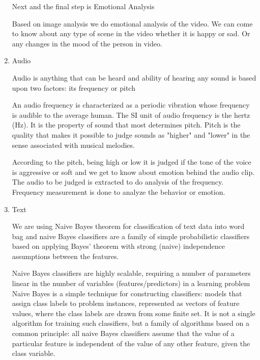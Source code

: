 \begin{enumerate}
	Next and the final step is Emotional Analysis
	
	Based on image analysis we do emotional analysis of the video. We can come to know about any type of scene in the video whether it is happy or sad. Or any changes in the mood of the person in video.
	
	\item Audio
	
	Audio is anything that can be heard and ability of hearing any sound is based upon two factors: its frequency or pitch
	
	An audio frequency  is characterized as a periodic vibration whose frequency is audible to the average human. The SI unit of audio frequency is the hertz (Hz). It is the property of sound that most determines pitch. Pitch is the quality that makes it possible to judge sounds as "higher" and "lower" in the sense associated with musical melodies.
	
	
	
	According to the pitch, being high or low it is judged if the tone of the voice is aggressive or soft and we get to know about emotion behind the audio clip. The audio to be judged is extracted to do analysis of the frequency. Frequency measurement is done to analyze the behavior or emotion.
	
	\item Text
	
	We are using Naive Bayes theorem for classification of text data into word bag and naive Bayes classifiers are a family of simple probabilistic classifiers based on applying Bayes' theorem with strong (naive) independence assumptions between the features.
	
	Naive Bayes classifiers are highly scalable, requiring a number of parameters linear in the number of variables (features/predictors) in a learning problem Naive Bayes is a simple technique for constructing classifiers: models that assign class labels to problem instances, represented as vectors of feature values, where the class labels are drawn from some finite set. It is not a single algorithm for training such classifiers, but a family of algorithms based on a common principle: all naive Bayes classifiers assume that the value of a particular feature is independent of the value of any other feature, given the class variable. 
\end{enumerate}